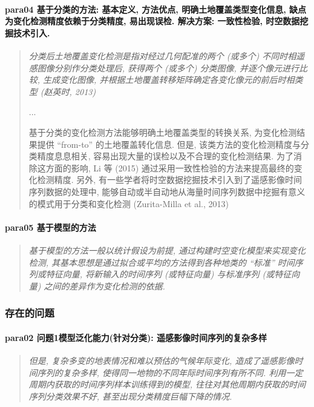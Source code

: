 \paragraph*{para04
    \textcolor[RGB]{17, 205, 29}{基于分类的方法: 基本定义, 方法优点, 明确土地覆盖类型变化信息, 缺点为变化检测精度依赖于分类精度, 易出现误检. 解决方案: 一致性检验, 时空数据挖掘技术引入.}}
\begin{quotation}
    \itshape
    分类后土地覆盖变化检测是指对经过几何配准的两个 (或多个) 不同时相遥感图像分别作分类处理后, 获得两个 (或多个) 分类图像, 并逐个像元进行比较, 生成变化图像, 并根据土地覆盖转移矩阵确定各变化像元的前后时相类型 (赵英时, 2013) 

    ...    

    基于分类的变化检测方法能够明确土地覆盖类型的转换关系, 为变化检测结果提供 ``from-to'' 的土地覆盖转化信息. 但是, 该类方法的变化检测精度与分类精度息息相关, 容易出现大量的误检以及不合理的变化检测结果. 为了消除这方面的影响, Li 等 (2015) 通过采用一致性检验的方法来提高最终的变化检测精度. 另外, 有一些学者将时空数据挖掘技术引入到了遥感影像时间序列数据的处理中, 能够自动或半自动地从海量时间序列数据中挖掘有意义的模式用于分类和变化检测 (Zurita-Milla et al., 2013) 
\end{quotation}

\paragraph*{para05
    \textcolor[RGB]{17, 205, 29}{基于模型的方法}}
\begin{quotation}
    \itshape
    基于模型的方法一般以统计假设为前提, 通过构建时空变化模型来实现变化检测, 其基本思想是通过拟合或平均的方法得到各种地类的 ``标准'' 时间序列或特征向量, 将新输入的时间序列 (或特征向量) 与标准序列 (或特征向量) 之间的差异作为变化检测的依据. 
\end{quotation}

\subsubsection{存在的问题}
\paragraph*{para02
    \textcolor[RGB]{17, 205, 29}{问题1模型泛化能力(针对分类): 遥感影像时间序列的复杂多样}}
\begin{quotation}
    \itshape
    但是, 复杂多变的地表情况和难以预估的气候年际变化, 造成了遥感影像时间序列的复杂多样, 使得同一地物的不同年际时间序列有所不同. 利用一定周期内获取的时间序列样本训练得到的模型, 往往对其他周期内获取的时间序列分类效果不好, 甚至出现分类精度巨幅下降的情况.
\end{quotation}

